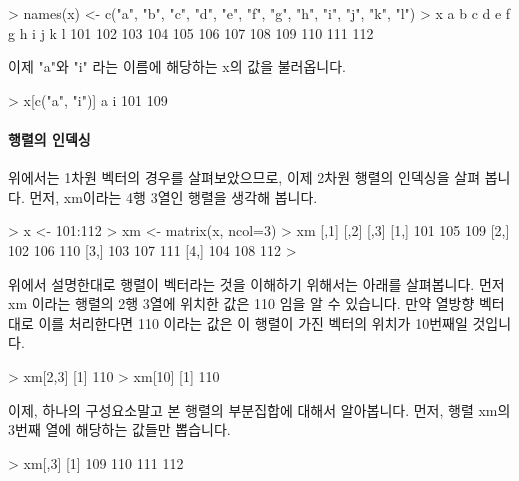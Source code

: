 \documentclass[tutorial.tex]{subfiles}
\begin{document}
\begin{Schunk}
\begin{Soutput}
> names(x) <- c("a", "b", "c", "d", "e", "f", "g", "h", "i", "j", "k", "l")
> x
  a   b   c   d   e   f   g   h   i   j   k   l 
101 102 103 104 105 106 107 108 109 110 111 112 
\end{Soutput}
\end{Schunk}

이제 "a"와 "i" 라는 이름에 해당하는 x의 값을 불러옵니다. 

\begin{Schunk}
\begin{Soutput}
> x[c("a", "i")]
  a   i 
101 109 
\end{Soutput}
\end{Schunk}

\paragraph{행렬의 인덱싱} 
위에서는 1차원 벡터의 경우를 살펴보았으므로, 이제 2차원 행렬의 인덱싱을 살펴 봅니다. 
먼저, xm이라는 4행 3열인 행렬을 생각해 봅니다. 

\begin{Schunk}
\begin{Soutput}
> x <- 101:112
> xm <- matrix(x, ncol=3)
> xm
     [,1] [,2] [,3]
[1,]  101  105  109
[2,]  102  106  110
[3,]  103  107  111
[4,]  104  108  112
> 
\end{Soutput}
\end{Schunk}

위에서 설명한대로 행렬이 벡터라는 것을 이해하기 위해서는 아래를 살펴봅니다. 
먼저 xm 이라는 행렬의 2행 3열에 위치한 값은 110 임을 알 수 있습니다. 
만약 열방향 벡터대로 이를 처리한다면 110 이라는 값은 이 행렬이 가진 벡터의 위치가 10번째일 것입니다.

\begin{Schunk}
\begin{Soutput}
> xm[2,3]
[1] 110
> xm[10]
[1] 110
\end{Soutput}
\end{Schunk}

이제, 하나의 구성요소말고 본 행렬의 부분집합에 대해서 알아봅니다. 
먼저, 행렬 xm의 3번째 열에 해당하는 값들만 뽑습니다. 

\begin{Schunk}
\begin{Soutput}
> xm[,3]
[1] 109 110 111 112
\end{Soutput}
\end{Schunk}
\end{document}
